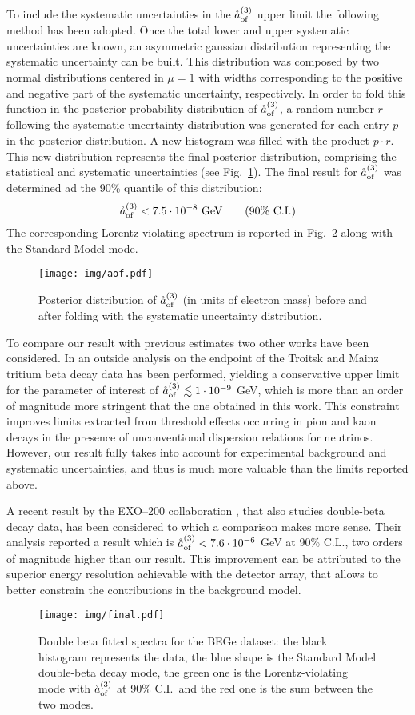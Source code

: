 To include the systematic uncertainties in the $\mathring{a}_\text{of}^{(3)}$ upper limit the following method has been adopted. Once the total lower and upper systematic uncertainties are known, an asymmetric gaussian distribution representing the systematic uncertainty can be built. This distribution was composed by two normal distributions centered in $\mu=1$ with widths corresponding to the positive and negative part of the systematic uncertainty, respectively. In order to fold this function in the posterior probability distribution of $\mathring{a}_\text{of}^{(3)}$, a random number $r$ following the systematic uncertainty distribution was generated for each entry $p$ in the posterior distribution. A new histogram was filled with the product $p\cdot r$. This new distribution represents the final posterior distribution, comprising the statistical and systematic uncertainties (see Fig.~\ref{fig:aofpost}). The final result for $\mathring{a}_\text{of}^{(3)}$ was determined ad the 90\% quantile of this distribution:
\begin{equation}\mathring{a}_\text{of}^{(3)}<7.5\cdot10^{-8}\ \text{GeV}\qquad(\text{90\% C.I.})\label{eq:aoffinal}\end{equation}
The corresponding Lorentz-violating spectrum is reported in Fig.~\ref{fig:final} along with the Standard Model mode.

\begin{figure}
	\centering
	\texttt{[image: img/aof.pdf]}
	\caption{Posterior distribution of $\mathring{a}_\text{of}^{(3)}$ (in units of electron mass) before and after folding with the systematic uncertainty distribution.}\label{fig:aofpost}
\end{figure}
 To compare our result with previous estimates two other works have been considered. In \cite{Diaz:2013saa} an outside analysis on the endpoint of the Troitsk and Mainz tritium beta decay data has been performed, yielding a conservative upper limit for the parameter of interest of $\mathring{a}_\text{of}^{(3)}\lesssim1\cdot10^{-9}$ GeV, which is more than an order of magnitude more stringent that the one obtained in this work. This constraint improves limits extracted from threshold effects occurring in pion and kaon decays in the presence of unconventional dispersion relations for neutrinos. However, our result fully takes into account for experimental background and systematic uncertainties, and thus is much more valuable than the limits reported above.

A recent result by the EXO--200 collaboration \cite{exo200}, that also studies double-beta decay data, has been considered to which a comparison makes more sense. Their analysis reported a result which is $\mathring{a}_\text{of}^{(3)}<7.6\cdot10^{-6}$ GeV at 90\% C.L., two orders of magnitude higher than our result. This improvement can be attributed to the superior energy resolution achievable with the {\gerda} detector array, that allows to better constrain the contributions in the background model.
\begin{figure}
	\centering
	\texttt{[image: img/final.pdf]}
	\caption{Double beta fitted spectra for the BEGe dataset: the black histogram represents the data, the blue shape is the Standard Model double-beta decay mode, the green one is the Lorentz-violating mode with $\mathring{a}_\text{of}^{(3)}$ at 90\% C.I.~and the red one is the sum between the two modes.}\label{fig:final}
\end{figure}
